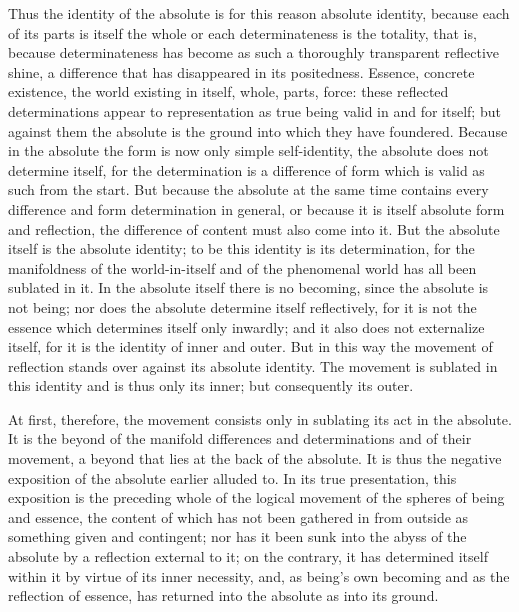 Thus the identity of the absolute is
for this reason absolute identity,
because each of its parts is itself the whole
or each determinateness is the totality, that is,
because determinateness has become as such
a thoroughly transparent reflective shine,
a difference that has disappeared in its positedness.
Essence, concrete existence, the world existing in itself,
whole, parts, force:
these reflected determinations appear to representation
as true being valid in and for itself;
but against them the absolute is the ground
into which they have foundered.
Because in the absolute the form is
now only simple self-identity,
the absolute does not determine itself,
for the determination is a difference of form
which is valid as such from the start.
But because the absolute at the same time contains
every difference and form determination in general,
or because it is itself absolute form and reflection,
the difference of content must also come into it.
But the absolute itself is the absolute identity;
to be this identity is its determination,
for the manifoldness of the world-in-itself
and of the phenomenal world has all been sublated in it.
In the absolute itself there is no becoming,
since the absolute is not being;
nor does the absolute determine itself reflectively,
for it is not the essence which determines itself only inwardly;
and it also does not externalize itself,
for it is the identity of inner and outer.
But in this way the movement of reflection
stands over against its absolute identity.
The movement is sublated in this identity
and is thus only its inner;
but consequently its outer.

At first, therefore, the movement consists only
in sublating its act in the absolute.
It is the beyond of the manifold differences
and determinations and of their movement,
a beyond that lies at the back of the absolute.
It is thus the negative exposition of the absolute
earlier alluded to.
In its true presentation, this exposition is
the preceding whole of the logical movement
of the spheres of being and essence,
the content of which has not been gathered in
from outside as something given and contingent;
nor has it been sunk into the abyss of the absolute
by a reflection external to it;
on the contrary, it has determined itself within it
by virtue of its inner necessity,
and, as being's own becoming and as the reflection of essence,
has returned into the absolute as into its ground.

